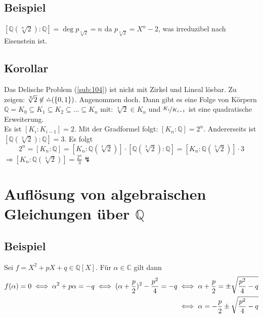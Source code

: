 \subsection[Beispiel: Begründung warum der algebraische Abschluss von $\mathds{Q}$ nicht endlich ist]{Beispiel} %
\label{sub:1133}
$[\mathds{Q}(\sqrt[n]{2}) :\mathds{Q}] = \deg p_{\sqrt[n]{2}} = n$ da $p_{\sqrt[n]{2}} = X^n -2$, was irreduzibel nach Eisenstein ist.

\subsection[Korollar: Das Delische Problem ist nicht mit Zirkel und Lineal lösbar]{Korollar} %
\label{sub:1134}
Das Delische Problem (\ref{sub:104}) ist nicht mit Zirkel und Lineal lösbar.
Zu zeigen: $\sqrt[3]{2}  \not\in \zirkel (\{0,1\})$. Angenommen doch. Dann gibt es eine Folge von Körpern $\mathds{Q}=K_0 \subseteq K_1 \subseteq K_2 \subseteq  \ldots \subseteq K_n$ mit: $\sqrt[3]{2} \in K_n  $ und $\nicefrac{K_i}{K_{i-1}}$ ist eine quadratische Erweiterung.\\
Es ist $[K_i : K_{i-1}] =2$. Mit der Gradformel folgt: $[K_n :\mathds{Q}] = 2^n$. Andererseits ist $[\mathds{Q}(\sqrt[3]{2}  ) :\mathds{Q}]=3$. Es folgt 
\[
	2^n = [K_n : \mathds{Q}] = \left[K_n : \mathds{Q}(\sqrt[3]{2}  )\right] \cdot \left[\mathds{Q}(\sqrt[3]{2}) :\mathds{Q}\right] 
	= \left[K_n : \mathds{Q}(\sqrt[3]{2}  )\right] \cdot 3
\]
$\Rightarrow [K_n : \mathds{Q}(\sqrt[3]{2}  )] = \frac{2^n}{3} \lightning$  \bewende
\newpage
\section{Auflösung von algebraischen Gleichungen über $\mathds{Q}$} %
\label{sec:12}
\subsection[Beispiel: $pq$-Formel]{Beispiel} %
\label{sub:12.1}
Sei $f= X^2 + pX+ q \in \mathds{Q}[X]$. Für $\alpha \in \mathds{C}$ gilt dann 
\begin{align*}
	f(\alpha)=0 \iff \alpha^2+ p \alpha= -q \iff (\alpha+ \frac{p}{2} )^2- \frac{p^2}{4} = -q &\iff \alpha+ \frac{p}{2} = \pm \sqrt{\frac{p^2}{4}-q }\\
	&\iff \alpha= - \frac{p}{2} \pm \sqrt{\frac{p^2}{4}-q }
\end{align*}

